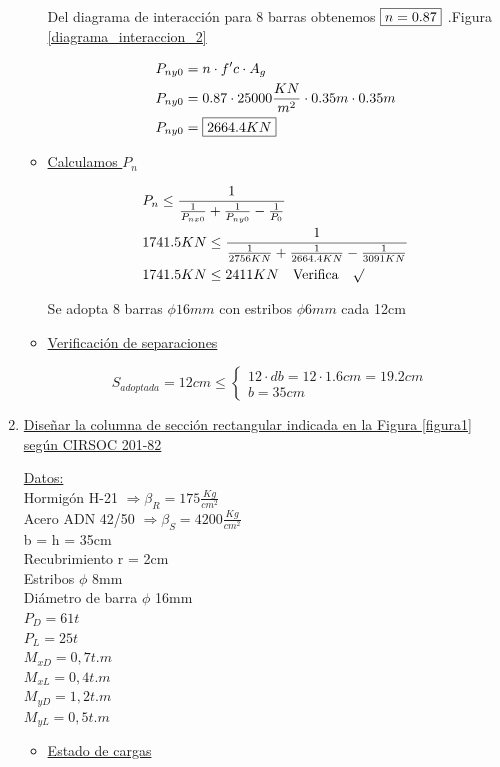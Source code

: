 \begin{enumerate}
\begin{itemize}
Del diagrama de interacción para 8 barras obtenemos $\framebox{$n=0.87$}$ .Figura \ref{diagrama_interaccion_2}

\begin{align*}
& P_{ny0} = n \cdot f'c \cdot A_g\\
& P_{ny0} = 0.87 \cdot 25000 \frac{KN}{m^2} \cdot 0.35m \cdot 0.35m\\
& P_{ny0} = \framebox{$2664.4 KN$}
\end{align*}

\item \underline{Calculamos $P_n$}

\begin{align*}
& P_n \leq \frac{1}{\frac{1}{P_{nx0}}+\frac{1}{P_{ny0}}-\frac{1}{P_0}}\\
& 1741.5 KN \leq \frac{1}{\frac{1}{2756 KN}+\frac{1}{2664.4 KN}-\frac{1}{3091 KN}}\\
& 1741.5 KN \leq 2411 KN \quad \text{Verifica} \quad \surd
\end{align*}

Se adopta 8 barras $\phi 16 mm$ con estribos $\phi 6 mm$ cada 12cm

\item \underline{Verificación de separaciones}

\[ S_{adoptada} = 12cm \leq \left\{ \begin{array}{ll}
         12 \cdot db = 12 \cdot 1.6cm = 19.2cm & \\
         b = 35cm & \end{array} \right. \]
\end{itemize}

\newpage
\item \underline{Diseñar la columna de sección rectangular indicada en la Figura \ref{figura1} según CIRSOC 201-82}

\underline{Datos:}\\
Hormigón H-21 $\Rightarrow \beta_R = 175 \frac{Kg}{cm^2}$\\
Acero ADN 42/50 $\Rightarrow \beta_S = 4200 \frac{Kg}{cm^2}$\\
b = h = 35cm\\
Recubrimiento r = 2cm\\
Estribos $\phi$ 8mm\\
Diámetro de barra $\phi$ 16mm\\
$P_D = 61 t$\\
$P_L = 25 t$\\
$M_{xD} = 0,7 t.m$\\
$M_{xL} = 0,4 t.m$\\
$M_{yD} = 1,2 t.m$\\
$M_{yL} = 0,5 t.m$\\
\begin{itemize}
\item \underline{Estado de cargas}


\end{itemize}
\end{enumerate}
